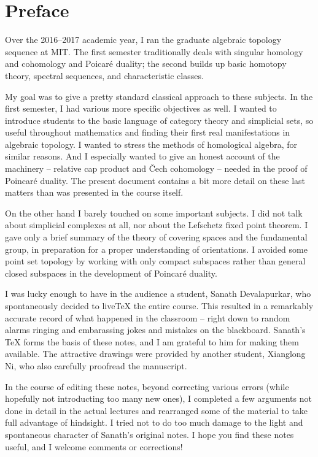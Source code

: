 \cleardoublepage
\section*{Preface}
Over the 2016--2017 academic year, I ran the graduate algebraic topology 
sequence at MIT. The first semester traditionally deals with singular homology
and cohomology and Poicar\'e duality; the second builds up basic homotopy 
theory, spectral sequences, and characteristic classes. 

My goal was to give a pretty standard classical approach to these subjects. 
In the first semester, I had various more specific objectives as well. 
I wanted to introduce students to the basic language of category theory
and simplicial sets, so useful throughout
mathematics and finding their first real manifestations in algebraic 
topology. I wanted to stress the methods of homological algebra,
for similar reasons. And I especially wanted 
to give an honest account of the machinery -- relative cap product and
\v{C}ech cohomology --  needed in the proof of Poincar\'e duality. 
The present document contains a bit more detail on these last matters
than was presented in the course itself.

On the other hand I barely touched on some important subjects. 
I did not talk about simplicial complexes at all, nor about the 
Lefschetz fixed point theorem. I gave only a brief summary of
the theory of covering spaces and the fundamental group, in preparation
for a proper understanding of orientations. I avoided some point set
topology by working with only compact subspaces rather than general closed 
subspaces in the development of Poincar\'e duality. 

I was lucky enough to have in the audience a student, Sanath Devalapurkar, 
who spontaneously decided to {live\TeX} the entire course. This resulted in 
a remarkably accurate record of what happened in the classroom -- right down
to random alarms ringing and embarassing jokes and mistakes on the blackboard. 
Sanath's \TeX{} forms the basis of these notes, and I am grateful to him 
for making them available. The attractive  drawings were provided by
another student, Xianglong Ni, who also carefully proofread the manuscript.

In the course of editing these notes, beyond correcting various errors 
(while hopefully not introducting too many new ones), 
I completed a few arguments
not done in detail in the actual lectures and rearranged some of the
material to take full advantage of hindsight. I tried not to do too much
damage to the light and spontaneous character of Sanath's original notes. 
I hope you find these notes useful, and I welcome comments or corrections!





